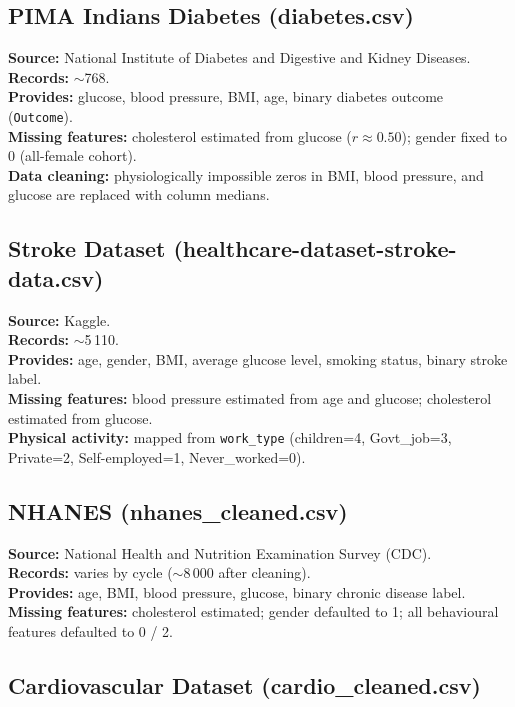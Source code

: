 \documentclass[12pt,a4paper]{report}
\begin{document}
\subsection{PIMA Indians Diabetes (diabetes.csv)}

\textbf{Source:} National Institute of Diabetes and Digestive and Kidney Diseases.\\
\textbf{Records:} $\sim$768.\\
\textbf{Provides:} glucose, blood pressure, BMI, age, binary diabetes outcome (\texttt{Outcome}).\\
\textbf{Missing features:} cholesterol estimated from glucose ($r \approx 0.50$); gender fixed to 0 (all-female cohort).\\
\textbf{Data cleaning:} physiologically impossible zeros in BMI, blood pressure, and glucose are replaced with column medians.

\subsection{Stroke Dataset (healthcare-dataset-stroke-data.csv)}

\textbf{Source:} Kaggle.\\
\textbf{Records:} $\sim$5\,110.\\
\textbf{Provides:} age, gender, BMI, average glucose level, smoking status, binary stroke label.\\
\textbf{Missing features:} blood pressure estimated from age and glucose; cholesterol estimated from glucose.\\
\textbf{Physical activity:} mapped from \texttt{work\_type} (children=4, Govt\_job=3, Private=2, Self-employed=1, Never\_worked=0).

\subsection{NHANES (nhanes\_cleaned.csv)}

\textbf{Source:} National Health and Nutrition Examination Survey (CDC).\\
\textbf{Records:} varies by cycle ($\sim$8\,000 after cleaning).\\
\textbf{Provides:} age, BMI, blood pressure, glucose, binary chronic disease label.\\
\textbf{Missing features:} cholesterol estimated; gender defaulted to 1; all behavioural features defaulted to 0 / 2.

\subsection{Cardiovascular Dataset (cardio\_cleaned.csv)}
\end{document}
